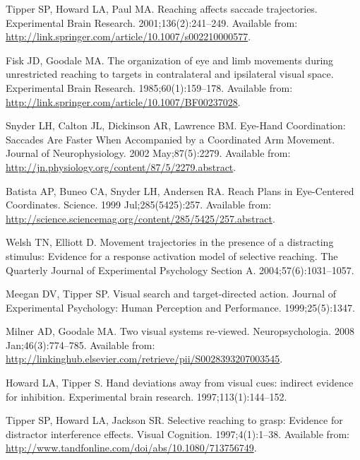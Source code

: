 \documentclass[10pt,letterpaper]{article}
\begin{document}
\begin{thebibliography}{10}
Tipper SP, Howard LA, Paul MA.
\newblock Reaching affects saccade trajectories.
\newblock Experimental Brain Research. 2001;136(2):241--249.
\newblock Available from:
  \url{http://link.springer.com/article/10.1007/s002210000577}.

Fisk JD, Goodale MA.
\newblock The organization of eye and limb movements during unrestricted
  reaching to targets in contralateral and ipsilateral visual space.
\newblock Experimental Brain Research. 1985;60(1):159--178.
\newblock Available from:
  \url{http://link.springer.com/article/10.1007/BF00237028}.

Snyder LH, Calton JL, Dickinson AR, Lawrence BM.
\newblock Eye-{Hand} {Coordination}: {Saccades} {Are} {Faster} {When}
  {Accompanied} by a {Coordinated} {Arm} {Movement}.
\newblock Journal of Neurophysiology. 2002 May;87(5):2279.
\newblock Available from:
  \url{http://jn.physiology.org/content/87/5/2279.abstract}.

Batista AP, Buneo CA, Snyder LH, Andersen RA.
\newblock Reach {Plans} in {Eye}-{Centered} {Coordinates}.
\newblock Science. 1999 Jul;285(5425):257.
\newblock Available from:
  \url{http://science.sciencemag.org/content/285/5425/257.abstract}.

Welsh TN, Elliott D.
\newblock Movement trajectories in the presence of a distracting stimulus:
  {Evidence} for a response activation model of selective reaching.
\newblock The Quarterly Journal of Experimental Psychology Section A.
  2004;57(6):1031--1057.

Meegan DV, Tipper SP.
\newblock Visual search and target-directed action.
\newblock Journal of Experimental Psychology: Human Perception and Performance.
  1999;25(5):1347.

Milner AD, Goodale MA.
\newblock Two visual systems re-viewed.
\newblock Neuropsychologia. 2008 Jan;46(3):774--785.
\newblock Available from:
  \url{http://linkinghub.elsevier.com/retrieve/pii/S0028393207003545}.

Howard LA, Tipper S.
\newblock Hand deviations away from visual cues: indirect evidence for
  inhibition.
\newblock Experimental brain research. 1997;113(1):144--152.

Tipper SP, Howard LA, Jackson SR.
\newblock Selective reaching to grasp: {Evidence} for distractor interference
  effects.
\newblock Visual Cognition. 1997;4(1):1--38.
\newblock Available from:
  \url{http://www.tandfonline.com/doi/abs/10.1080/713756749}.


\end{thebibliography}
\end{document}

